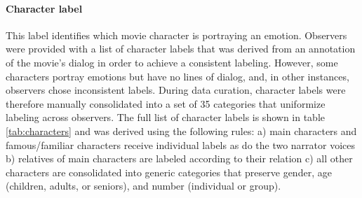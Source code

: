 \documentclass[10pt,a4paper,twocolumn]{article}
\begin{document}
\paragraph{Character label}

This label identifies which movie character is portraying an emotion. Observers
were provided with a list of character labels that was derived from an
annotation of the movie's dialog in order to achieve a consistent labeling.
However, some characters portray emotions but have no lines of dialog, and, in
other instances, observers chose inconsistent labels. During data curation,
character labels were therefore manually consolidated into a set of 35
categories that uniformize labeling across observers. The full list of character
labels is shown in table \ref{tab:characters} and was derived using the
following rules: a) main characters and famous/familiar characters receive
individual labels as do the two narrator voices b) relatives of main characters
are labeled according to their relation c) all other characters are consolidated
into generic categories that preserve gender, age (children, adults, or
seniors), and number (individual or group).
\end{document}
